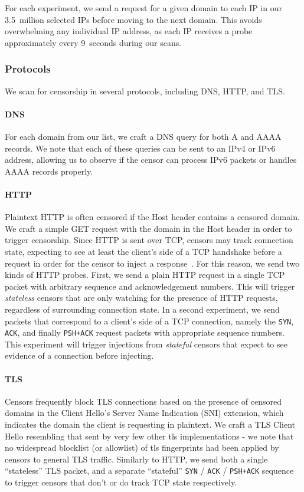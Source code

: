 For each experiment, we send a request for a given domain to each IP in our
3.5~million selected IPs before moving to the next domain. This avoids
overwhelming any individual IP address, as each IP receives a probe
approximately every 9~seconds during our scans.

\subsubsection{Protocols}
We scan for censorship in several protocols, including DNS, HTTP, and TLS.

\paragraph{DNS} For each domain from our list, we craft a DNS query for both A
and AAAA records. We note that each of these queries can be sent to an IPv4 or
IPv6 address, allowing us to observe if the censor can process IPv6 packets or
handles AAAA records properly.

\paragraph{HTTP} Plaintext HTTP is often censored if the Host header contains 
a censored domain. We craft a simple GET request with the domain in the Host
header in order to trigger censorship. %
Since HTTP is sent over TCP, censors may track connection
state, expecting to see at least the client's side of a TCP handshake before a
request in order for the censor to inject a response~\cite{bock2021your}. For
this reason, we send two kinds of HTTP probes. First, we send a plain HTTP
request in a single TCP packet with arbitrary sequence and acknowledgement
numbers. This will trigger \emph{stateless} censors that are only watching for
the presence of HTTP requests, regardless of surrounding connection state. In a
second experiment, we send packets that correspond to a client's side of a TCP
connection, namely the \texttt{SYN}, \texttt{ACK}, and finally \texttt{PSH+ACK}
request packets with appropriate sequence numbers. This experiment will trigger
injections from \emph{stateful} censors that expect to see evidence of a
connection before injecting.

\paragraph{TLS} Censors frequently block TLS connections based on the presence
of censored domains in the Client Hello's Server Name Indication (SNI)
extension, which indicates the domain the client is requesting in plaintext. We
craft a TLS Client Hello resembling that sent by very few other tls
implementations - we note that no widespread blocklist (or allowlist) of tls
fingerprints had been applied by censors to general TLS traffic. Similarly to
HTTP, we send both a single ``stateless'' TLS packet, and a separate
``stateful'' \texttt{SYN} / \texttt{ACK} / \texttt{PSH+ACK} sequence to trigger
censors that don't or do track TCP state respectively.

